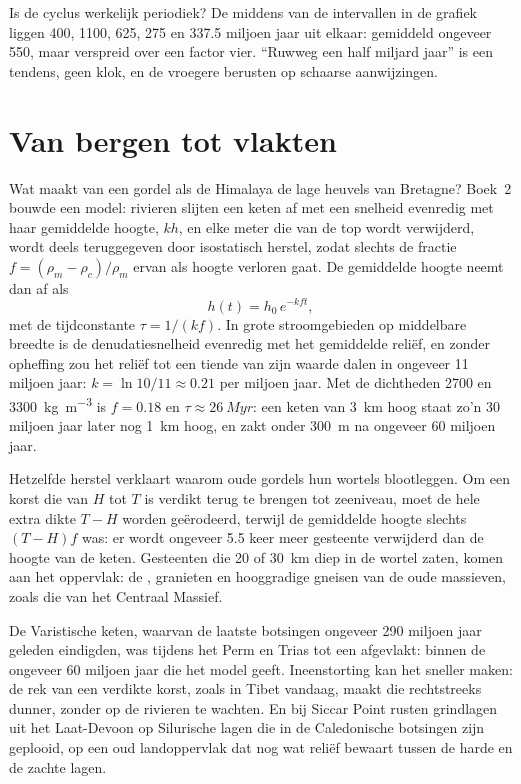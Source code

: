 Is de cyclus werkelijk periodiek? De middens van de intervallen in de grafiek liggen 400,
1100, 625, 275 en 337.5 miljoen jaar uit elkaar: gemiddeld ongeveer 550, maar verspreid over een factor
vier. ``Ruwweg een half miljard jaar'' is een tendens, geen klok, en de vroegere
 berusten op schaarse aanwijzingen.

\section{Van bergen tot vlakten}\label{sec:b2:wilson-cycle:erosion}

Wat maakt van een gordel als de Himalaya de lage heuvels van Bretagne? Boek~2
bouwde een model: rivieren slijten een keten af met een snelheid evenredig met haar gemiddelde hoogte, $kh$,
en elke meter die van de top wordt verwijderd, wordt deels teruggegeven door isostatisch herstel, zodat slechts
de fractie $f = (\rho_m - \rho_c)/\rho_m$ ervan als hoogte verloren gaat. De gemiddelde hoogte
neemt dan af als
\[
  h(t) = h_0\,e^{-k f t} ,
\]
met de tijdconstante $\tau = 1/(kf)$. In grote stroomgebieden op middelbare breedte is de denudatiesnelheid
evenredig met het gemiddelde reliëf, en zonder opheffing zou het reliëf tot een tiende van zijn
waarde dalen in ongeveer 11 miljoen jaar: $k = \ln 10/11 \approx 0.21$ per miljoen jaar. Met de
dichtheden 2700 en \qty{3300}{kg.m^{-3}} is $f = 0.18$ en $\tau \approx \qty{26}{Myr}$: een
keten van \qty{3}{km} hoog staat zo'n 30 miljoen jaar later nog \qty{1}{km} hoog, en zakt
onder \qty{300}{m} na ongeveer 60 miljoen jaar.

Hetzelfde herstel verklaart waarom oude gordels hun wortels blootleggen. Om een korst die van
$H$ tot $T$ is verdikt terug te brengen tot zeeniveau, moet de hele extra dikte $T - H$ worden geërodeerd, terwijl de gemiddelde
hoogte slechts $(T - H)f$ was: er wordt ongeveer 5.5 keer meer gesteente verwijderd dan de hoogte van de
keten. Gesteenten die 20 of \qty{30}{km} diep in de wortel zaten, komen aan het oppervlak: de
, granieten en hooggradige gneisen van de oude massieven, zoals die van het Centraal
Massief.

De Varistische keten, waarvan de laatste botsingen ongeveer 290 miljoen jaar geleden eindigden, was
tijdens het Perm en Trias tot een  afgevlakt: binnen de ongeveer 60 miljoen jaar
die het model geeft. Ineenstorting kan het sneller maken: de rek van een verdikte korst, zoals in
Tibet vandaag, maakt die rechtstreeks dunner, zonder op de rivieren te wachten. En bij Siccar Point rusten grindlagen uit het Laat-Devoon op
Silurische lagen die in de Caledonische botsingen zijn geplooid, op een oud landoppervlak dat nog
wat reliëf bewaart tussen de harde en de zachte lagen.

